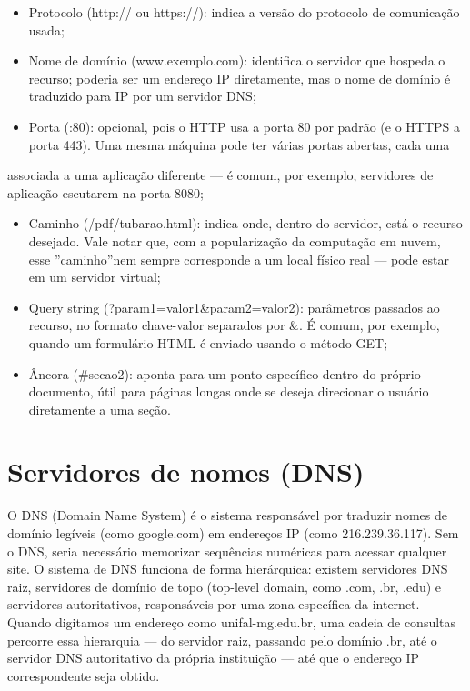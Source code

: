 \begin{itemize}
  \item Protocolo (http:// ou https://): indica a versão do protocolo de comunicação usada;
\end{itemize}

\begin{itemize}
  \item Nome de domínio (www.exemplo.com): identifica o servidor que hospeda o recurso; poderia ser um endereço IP diretamente, mas o nome de domínio é traduzido para IP por um servidor DNS;
\end{itemize}

\begin{itemize}
  \item Porta (:80): opcional, pois o HTTP usa a porta 80 por padrão (e o HTTPS a porta 443). Uma mesma máquina pode ter várias portas abertas, cada uma
\end{itemize}

associada a uma aplicação diferente — é comum, por exemplo, servidores de aplicação escutarem na porta 8080;

\begin{itemize}
  \item Caminho (/pdf/tubarao.html): indica onde, dentro do servidor, está o recurso desejado. Vale notar que, com a popularização da computação em nuvem, esse ”caminho”nem sempre corresponde a um local físico real — pode estar em um servidor virtual;
  \item Query string (?param1=valor1\&param2=valor2): parâmetros passados ao recurso, no formato chave-valor separados por \&. É comum, por exemplo, quando um formulário HTML é enviado usando o método GET;
  \item Âncora (\#secao2): aponta para um ponto específico dentro do próprio documento, útil para páginas longas onde se deseja direcionar o usuário diretamente a uma seção.
\end{itemize}

\section{Servidores de nomes (DNS)}

O DNS (Domain Name System) é o sistema responsável por traduzir nomes de domínio legíveis (como google.com) em endereços IP (como 216.239.36.117). Sem o DNS, seria necessário memorizar sequências numéricas para acessar qualquer site. O sistema de DNS funciona de forma hierárquica: existem servidores DNS raiz, servidores de domínio de topo (top-level domain, como .com, .br, .edu) e servidores autoritativos, responsáveis por uma zona específica da internet. Quando digitamos um endereço como unifal-mg.edu.br, uma cadeia de consultas percorre essa hierarquia — do servidor raiz, passando pelo domínio .br, até o servidor DNS autoritativo da própria instituição — até que o endereço IP correspondente seja obtido.


